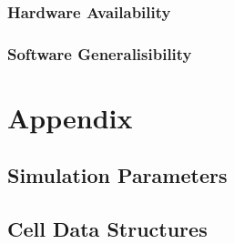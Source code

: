 \documentclass{UoYCSproject}
\begin{document}
\subsection{Hardware Availability}

\subsection{Software Generalisibility}%


\printbibliography
\chapter{Appendix}
\section{Simulation Parameters}


\section{Cell Data Structures}
 
\end{document}
